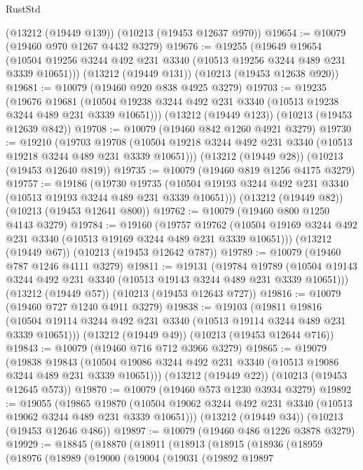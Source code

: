 \begin{lexlean}{RustStd}
\begin{coremodule}
    (@13212 (@19449 @139))
    (@10213 (@19453 @12637 @970))
@19654 := @10079 (@19460 @970 @1267 @4432 @3279)
@19676 := @19255
    (@19649
      @19654
      (@10504 @19256 @3244 @492 @231 @3340 (@10513 @19256 @3244 @489 @231 @3339 @10651)))
    (@13212 (@19449 @131))
    (@10213 (@19453 @12638 @920))
@19681 := @10079 (@19460 @920 @838 @4925 @3279)
@19703 := @19235
    (@19676
      @19681
      (@10504 @19238 @3244 @492 @231 @3340 (@10513 @19238 @3244 @489 @231 @3339 @10651)))
    (@13212 (@19449 @123))
    (@10213 (@19453 @12639 @842))
@19708 := @10079 (@19460 @842 @1260 @4921 @3279)
@19730 := @19210
    (@19703
      @19708
      (@10504 @19218 @3244 @492 @231 @3340 (@10513 @19218 @3244 @489 @231 @3339 @10651)))
    (@13212 (@19449 @28))
    (@10213 (@19453 @12640 @819))
@19735 := @10079 (@19460 @819 @1256 @4175 @3279)
@19757 := @19186
    (@19730
      @19735
      (@10504 @19193 @3244 @492 @231 @3340 (@10513 @19193 @3244 @489 @231 @3339 @10651)))
    (@13212 (@19449 @82))
    (@10213 (@19453 @12641 @800))
@19762 := @10079 (@19460 @800 @1250 @4143 @3279)
@19784 := @19160
    (@19757
      @19762
      (@10504 @19169 @3244 @492 @231 @3340 (@10513 @19169 @3244 @489 @231 @3339 @10651)))
    (@13212 (@19449 @67))
    (@10213 (@19453 @12642 @787))
@19789 := @10079 (@19460 @787 @1246 @4111 @3279)
@19811 := @19131
    (@19784
      @19789
      (@10504 @19143 @3244 @492 @231 @3340 (@10513 @19143 @3244 @489 @231 @3339 @10651)))
    (@13212 (@19449 @57))
    (@10213 (@19453 @12643 @727))
@19816 := @10079 (@19460 @727 @1240 @4911 @3279)
@19838 := @19103
    (@19811
      @19816
      (@10504 @19114 @3244 @492 @231 @3340 (@10513 @19114 @3244 @489 @231 @3339 @10651)))
    (@13212 (@19449 @49))
    (@10213 (@19453 @12644 @716))
@19843 := @10079 (@19460 @716 @712 @3966 @3279)
@19865 := @19079
    (@19838
      @19843
      (@10504 @19086 @3244 @492 @231 @3340 (@10513 @19086 @3244 @489 @231 @3339 @10651)))
    (@13212 (@19449 @22))
    (@10213 (@19453 @12645 @573))
@19870 := @10079 (@19460 @573 @1230 @3934 @3279)
@19892 := @19055
    (@19865
      @19870
      (@10504 @19062 @3244 @492 @231 @3340 (@10513 @19062 @3244 @489 @231 @3339 @10651)))
    (@13212 (@19449 @34))
    (@10213 (@19453 @12646 @486))
@19897 := @10079 (@19460 @486 @1226 @3878 @3279)
@19929 := @18845
    (@18870
      (@18911
        (@18913
          (@18915
            (@18936
              (@18959
                (@18976
                  (@18989
                    (@19000
                      (@19004
                        (@19031
                          (@19892
                            @19897

\end{coremodule}
\end{lexlean}
